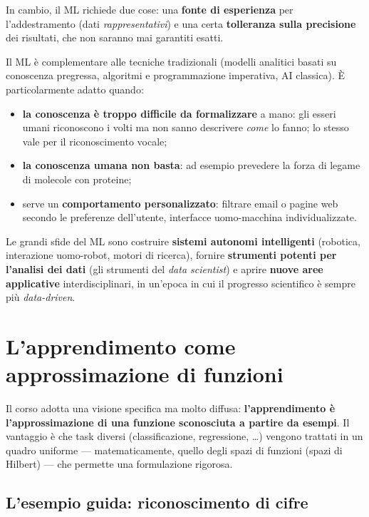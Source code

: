 In cambio, il ML richiede due cose: una \textbf{fonte di esperienza} per
l'addestramento (dati \emph{rappresentativi}) e una certa
\textbf{tolleranza sulla precisione} dei risultati, che non saranno mai
garantiti esatti.

Il ML è complementare alle tecniche tradizionali (modelli analitici
basati su conoscenza pregressa, algoritmi e programmazione imperativa,
AI classica). È particolarmente adatto quando:

\begin{itemize}
\tightlist
\item
  \textbf{la conoscenza è troppo difficile da formalizzare} a mano: gli
  esseri umani riconoscono i volti ma non sanno descrivere \emph{come}
  lo fanno; lo stesso vale per il riconoscimento vocale;
\item
  \textbf{la conoscenza umana non basta}: ad esempio prevedere la forza
  di legame di molecole con proteine;
\item
  serve un \textbf{comportamento personalizzato}: filtrare email o
  pagine web secondo le preferenze dell'utente, interfacce uomo-macchina
  individualizzate.
\end{itemize}

Le grandi sfide del ML sono costruire \textbf{sistemi autonomi
intelligenti} (robotica, interazione uomo-robot, motori di ricerca),
fornire \textbf{strumenti potenti per l'analisi dei dati} (gli strumenti
del \emph{data scientist}) e aprire \textbf{nuove aree applicative}
interdisciplinari, in un'epoca in cui il progresso scientifico è sempre
più \emph{data-driven}.

\section{L'apprendimento come approssimazione di
funzioni}\label{lapprendimento-come-approssimazione-di-funzioni}

Il corso adotta una visione specifica ma molto diffusa:
\textbf{l'apprendimento è l'approssimazione di una funzione sconosciuta
a partire da esempi}. Il vantaggio è che task diversi (classificazione,
regressione, \ldots) vengono trattati in un quadro uniforme ---
matematicamente, quello degli spazi di funzioni (spazi di Hilbert) ---
che permette una formulazione rigorosa.

\subsection{L'esempio guida: riconoscimento di
cifre}\label{lesempio-guida-riconoscimento-di-cifre}

